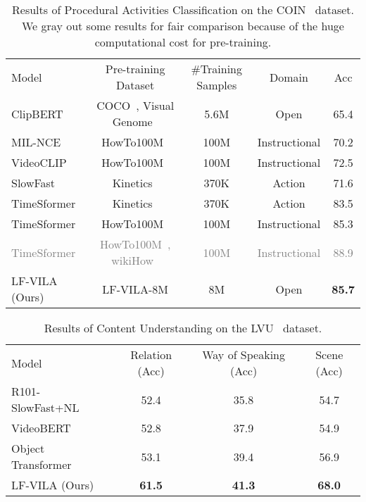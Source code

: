 \documentclass{article}
\begin{document}
\begin{table}[t]
    \small
    \centering
    \caption{Results of Procedural Activities Classification on the COIN~\cite{tang2019coin} dataset. We gray out some results for fair comparison because of the huge computational cost for pre-training.}
    \begin{tabular}{l c c c c} 
    \toprule
    Model & Pre-training Dataset & \#Training Samples &Domain & Acc \\
    \cmidrule{1-5}
    ClipBERT~\cite{lei2021clipbert} & COCO~\cite{chen2015mscoco}, Visual Genome~\cite{krishna2017visualgenome} & 5.6M  & Open & 65.4  \\
    MIL-NCE~\cite{miech2020milnce} &HowTo100M~\cite{miech2019howto100m} & 100M & Instructional & 70.2 \\
    VideoCLIP~\cite{xu2021videoclip} &HowTo100M~\cite{miech2019howto100m} & 100M & Instructional & 72.5  \\
    SlowFast~\cite{feichtenhofer2019slowfast} &Kinetics~\cite{carreira2017i3d-k600} &370K & Action & 71.6  \\
    TimeSformer~\cite{bertasius2021timesformer} &Kinetics~\cite{carreira2017i3d-k600} &370K & Action & 83.5 \\
    TimeSformer~\cite{bertasius2021timesformer} &HowTo100M~\cite{miech2019howto100m} & 100M  & Instructional & 85.3 \\
    \textcolor{gray}{TimeSformer~\cite{bertasius2021timesformer}} & \textcolor{gray}{HowTo100M~\cite{miech2019howto100m}, wikiHow~\cite{lin2022wikihow}} & \textcolor{gray}{100M}  & \textcolor{gray}{Instructional} & \textcolor{gray}{88.9}\\
    \cmidrule{1-5}
    LF-VILA (Ours)  &LF-VILA-8M & 8M & Open & \bf 85.7 \\
    \bottomrule
    \end{tabular}
    \label{tab:coin}
\end{table}


\begin{table}[t]
    \small
    \centering
    \caption{Results of Content Understanding on the LVU~\cite{wu2021towards-longform} dataset.}
    \begin{tabular}{l c c c} 
    \toprule
    Model & Relation (Acc) & Way of Speaking (Acc) & Scene (Acc) \\
    \cmidrule{1-4}
    R101-SlowFast+NL~\cite{feichtenhofer2019slowfast,he2016resnet,wang2018non-local} & 52.4 & 35.8 & 54.7  \\
    VideoBERT~\cite{sun2019videobert} & 52.8 & 37.9 & 54.9  \\
    Object Transformer~\cite{wu2021towards-longform} & 53.1 & 39.4 & 56.9 \\
    \cmidrule{1-4}
    LF-VILA (Ours)  & \bf 61.5 & \bf 41.3 & \bf 68.0   \\
    \bottomrule
    \end{tabular}
    \label{tab:lvu}
\end{table}
\end{document}
